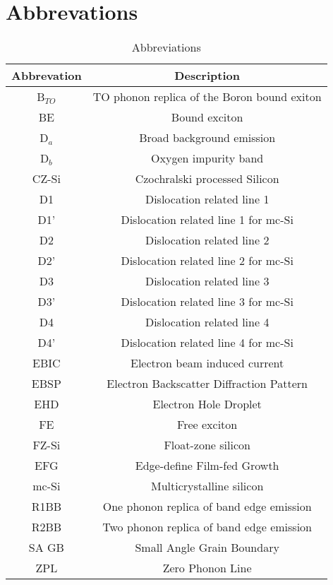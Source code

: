 		\section{Abbrevations}
		
		\begin{table}[H]
\centering
\begin{tabular}{|c|c|}
\hline

		\textbf{Abbrevation} & \textbf{Description} \\ \hline
		B$_{TO}$ & TO phonon replica of the Boron bound exiton  \\ \hline
		BE & Bound exciton \\ \hline
		D$_a$ & Broad background emission  \\ \hline
		D$_b$ & Oxygen impurity band  \\ \hline
		CZ-Si & Czochralski processed Silicon \\ \hline
		D1	& Dislocation related line 1  \\ \hline
		D1' & Dislocation related line 1 for mc-Si  \\ \hline
		D2	& Dislocation related line 2 \\ \hline
		D2' & Dislocation related line 2 for mc-Si  \\ \hline
		D3	& Dislocation related line 3  \\ \hline
		D3' & Dislocation related line 3 for mc-Si  \\ \hline
		D4	& Dislocation related line 4  \\ \hline
		D4' & Dislocation related line 4 for mc-Si  \\ \hline
		EBIC & Electron beam induced current \\ \hline
		EBSP & Electron Backscatter Diffraction Pattern \\ \hline
		EHD & Electron Hole Droplet	\\ \hline
		FE & Free exciton \\ \hline
		FZ-Si & Float-zone silicon \\ \hline
		EFG & Edge-define Film-fed Growth \\ \hline
		mc-Si & Multicrystalline silicon \\ \hline
		R1BB & One phonon replica of band edge emission \\ \hline
		R2BB & Two phonon replica of band edge emission \\ \hline
		SA GB & Small Angle Grain Boundary \\ \hline
		ZPL & Zero Phonon Line \\ \hline

		\end{tabular}
\caption{Abbreviations}
\label{abbreviations}
\end{table}
		
		
